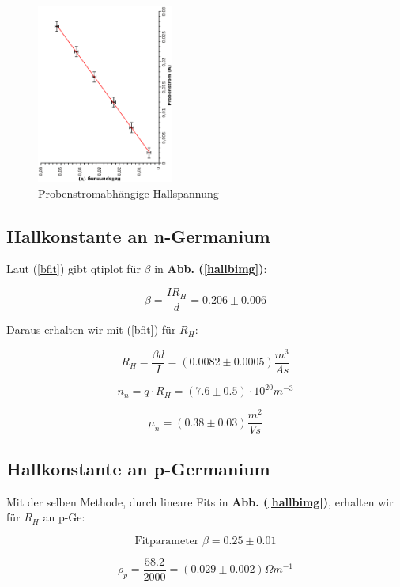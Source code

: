 \documentclass[12pt,a4paper,twopage]{article}
\begin{document}
\begin{figure}
\begin{center}
\includegraphics[width=0.4\textwidth, angle=-90]{hallkonst.eps}
\caption{Probenstromabhängige Hallspannung \label{hallspkonst}}
\end{center}
\end{figure}

\subsection*{Hallkonstante an n-Germanium}

Laut (\ref{bfit}) gibt qtiplot für $\beta$ in \textbf{Abb. (\ref{hallbimg})}:

$$ \beta = \frac{I R_H}{d} =  0.206 \pm 0.006 $$

Daraus erhalten wir mit (\ref{bfit}) für $R_H$:

\begin{center}
$$ \boxed{ R_{H} = \frac{\beta d}{I} = (0.0082 \pm 0.0005 )  \frac{m^3}{As}  } $$
\end{center}

\begin{center}
$$ \boxed{ n_{n} = q \cdot R_H = (7.6 \pm 0.5) \cdot 10^{20} m^{-3}  } $$
\end{center}

$$\boxed{ \mu_n = (0.38 \pm 0.03) \frac{m^2}{Vs} } $$

\subsection*{Hallkonstante an p-Germanium}
Mit der selben Methode, durch lineare Fits in \textbf{Abb. (\ref{hallbimg})}, erhalten wir für $R_H$ an p-Ge:

$$ \text{Fitparameter } \beta = 0.25 \pm 0.01 $$

$$\rho_p = \frac{58.2}{2000} = (0.029 \pm 0.002) \Omega m^{-1} $$
\end{document}
